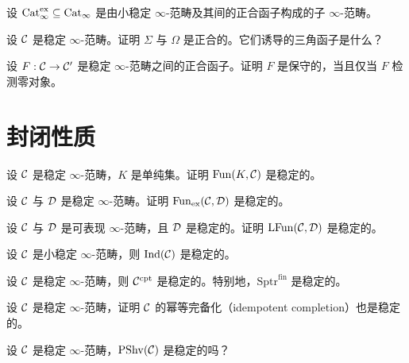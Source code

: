 \begin{definition}\label{L15-4.4}
设 $\operatorname{Cat}_{\infty}^{\mathrm{ex}}\subseteq\operatorname{Cat}_{\infty}$ 是由小稳定 $\infty$-范畴及其间的正合函子构成的子 $\infty$-范畴。
\end{definition}

\begin{exercise}\label{L15-4.5}
设 $\mathcal{C}$ 是稳定 $\infty$-范畴。证明 $\Sigma$ 与 $\Omega$ 是正合的。它们诱导的三角函子是什么？
\end{exercise}

\begin{exercise}\label{L15-4.6}
设 $F:\mathcal{C}\to\mathcal{C}'$ 是稳定 $\infty$-范畴之间的正合函子。证明 $F$ 是保守的，当且仅当 $F$ 检测零对象。
\end{exercise}

\section{封闭性质}

\begin{exercise}\label{L15-5.1}
设 $\mathcal{C}$ 是稳定 $\infty$-范畴，$K$ 是单纯集。证明 $\operatorname{Fun}(K,\mathcal{C})$ 是稳定的。
\end{exercise}

\begin{exercise}\label{L15-5.2}
设 $\mathcal{C}$ 与 $\mathcal{D}$ 是稳定 $\infty$-范畴。证明 $\operatorname{Fun}_{\mathrm{ex}}(\mathcal{C},\mathcal{D})$ 是稳定的。
\end{exercise}

\begin{exercise}\label{L15-5.3}
设 $\mathcal{C}$ 与 $\mathcal{D}$ 是可表现 $\infty$-范畴，且 $\mathcal{D}$ 是稳定的。证明 $\mathrm{LFun}(\mathcal{C},\mathcal{D})$ 是稳定的。
\end{exercise}

\begin{exercise}\label{L15-5.4}
设 $\mathcal{C}$ 是小稳定 $\infty$-范畴，则 $\operatorname{Ind}(\mathcal{C})$ 是稳定的。
\end{exercise}

\begin{exercise}\label{L15-5.5}
设 $\mathcal{C}$ 是稳定 $\infty$-范畴，则 $\mathcal{C}^{\mathrm{cpt}}$ 是稳定的。特别地，$\mathrm{Sptr}^{\mathrm{fin}}$ 是稳定的。
\end{exercise}

\begin{exercise}\label{L15-5.6}
设 $\mathcal{C}$ 是稳定 $\infty$-范畴，证明 $\mathcal{C}$ 的幂等完备化（idempotent completion）也是稳定的。
\end{exercise}

\begin{exercise}\label{L15-5.7}
设 $\mathcal{C}$ 是稳定 $\infty$-范畴，$\mathrm{PShv}(\mathcal{C})$ 是稳定的吗？
\end{exercise}

